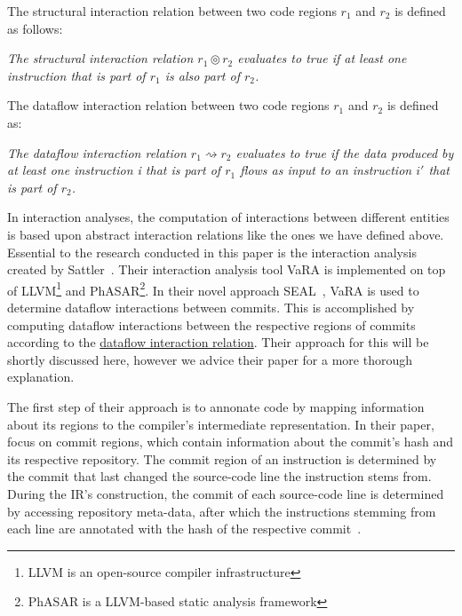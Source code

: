 The structural interaction relation between two code regions $r_1$ and $r_2$ is defined as follows:

\begin{definition}\label{def:structural_relation}
	\emph{The structural interaction relation $r_1 \circledcirc r_2$ evaluates to true if at least one instruction that is part of $r_1$
	is also part of $r_2$.}
\end{definition}

The dataflow interaction relation between two code regions $r_1$ and $r_2$ is defined as:

\begin{definition}\label{def:dataflow_relation}
	\emph{The dataflow interaction relation $r_1 \rightsquigarrow r_2$ evaluates to true if the data produced by at least one instruction i that is part of $r_1$
	flows as input to an instruction $i'$ that is part of $r_2$.}
\end{definition}

In interaction analyses, the computation of interactions between different entities is based upon abstract interaction relations like the ones we have defined above.
Essential to the research conducted in this paper is the interaction analysis created by Sattler~\cite{sattler2023seal}.
Their interaction analysis tool VaRA is implemented on top of LLVM\footnote{LLVM is an open-source compiler infrastructure} and PhASAR\footnote{PhASAR is a LLVM-based static analysis framework}.
In their novel approach SEAL~\cite{sattler2023seal}, VaRA is used to determine dataflow interactions between commits.
This is accomplished by computing dataflow interactions between the respective regions of commits according to the \hyperref[def:dataflow_relation]{dataflow interaction relation}.
Their approach for this will be shortly discussed here, however we advice their paper for a more thorough explanation. 

The first step of their approach is to annonate code by mapping information about its regions to the compiler's intermediate representation.
In their paper, \citet{sattler2023seal} focus on commit regions, which contain information about the commit's hash and its respective repository.
The commit region of an instruction is determined by the commit that last changed the source-code line the instruction stems from.
During the IR's construction, the commit of each source-code line is determined by accessing repository meta-data, after which the instructions stemming from each line are annotated with the hash of the respective commit~\cite{sattler2023seal}.

